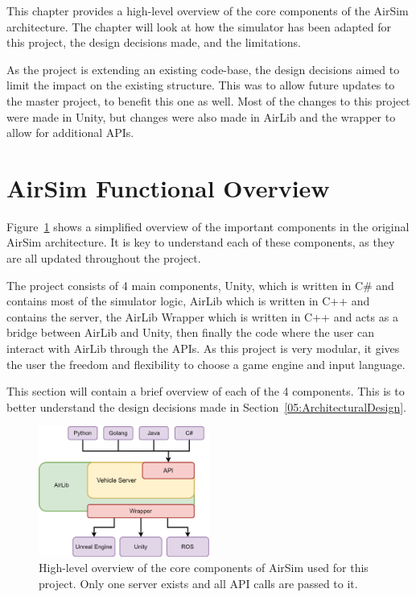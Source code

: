 This chapter provides a high-level overview of the core components of the AirSim architecture. The chapter will look at how the simulator has been adapted for this project, the design decisions made, and the limitations. 

As the project is extending an existing code-base, the design decisions aimed to limit the impact on the existing structure. This was to allow future updates to the master project, to benefit this one as well. Most of the changes to this project were made in Unity, but changes were also made in AirLib and the wrapper to allow for additional APIs. 

\section{AirSim Functional Overview} \label{05:Overview}
Figure~\ref{ADA:Figure:OriginalOverview} shows a simplified overview of the important components in the original AirSim architecture. It is key to understand each of these components, as they are all updated throughout the project. 


The project consists of 4 main components, Unity, which is written in C\# and contains most of the simulator logic, AirLib which is written in C++ and contains the server, the AirLib Wrapper which is written in C++ and acts as a bridge between AirLib and Unity, then finally the code where the user can interact with AirLib through the APIs. As this project is very modular, it gives the user the freedom and flexibility to choose a game engine and input language. 

This section will contain a brief overview of each of the 4 components. This is to better understand the design decisions made in Section~\ref{05:ArchitecturalDesign}.

\begin{figure}[h]
    \centering
    \includegraphics[width=0.5\textwidth]{05_AnalysisAndDesign/Diagrams/OriginalOverview.png}
    \caption{High-level overview of the core components of AirSim used for this project. Only one server exists and all API calls are passed to it.}
    \label{ADA:Figure:OriginalOverview}
\end{figure}



